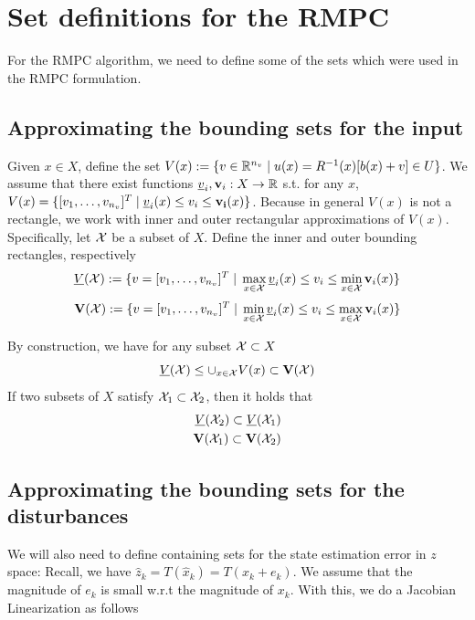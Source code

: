\section{Set definitions for the RMPC}

For the RMPC algorithm, we need to define some of the sets which were used in the RMPC formulation.

\subsection{Approximating the bounding sets for the input}
\label{sec:approx input sets}
Given $x \in X$, define the set $V(x) := \{v \in \mathbb{R}^{n_v} \;|\; u(x) = R^{-1}(x)[b(x)+v] \in U\}$.
We assume that there exist functions $\underline{v}_i, \mathbf{v}_i: X \rightarrow \mathbb{R}$ s.t. for any $x$, $V(x) = \{[v_1,\ldots,v_{n_v}]^T \;|\; \underline{v}_i(x) \leq v_i \leq \mathbf{v_i}(x) \}$.
Because in general $V(x)$ is not a rectangle, we work with inner and outer rectangular approximations of $V(x)$.
Specifically, let $\mathcal{X}$ be a subset of $X$.
Define the inner and outer bounding rectangles, respectively
\[\underline{V}(\mathcal{X}) := \{v=[v_1,\ldots,v_{n_v}]^T \;|\; \max_{x\in \mathcal{X}} \underline{v}_i(x)  \leq v_i \leq \min_{x \in \mathcal{X}} \mathbf{v}_i(x) \} \]
\[\mathbf{V}(\mathcal{X}) := \{v=[v_1,\ldots,v_{n_v}]^T \;|\; \min_{x\in \mathcal{X}} \underline{v}_i(x)  \leq v_i \leq \max_{x \in \mathcal{X}} \mathbf{v}_i(x) \} \]

By construction, we have for any subset $\mathcal{X} \subset X$
\begin{equation}
\label{eq:Vbounds}
\underline{V}(\mathcal{X}) \leq \cup_{x \in \mathcal{X}} V(x) \subset \mathbf{V}(\mathcal{X})
\end{equation}
If two subsets of $X$ satisfy $\mathcal{X}_1 \subset \mathcal{X}_2$, then it holds that 
\begin{eqnarray}
\label{eq:V inclusions}
\underline{V}(\mathcal{X}_2) \subset \underline{V}(\mathcal{X}_1)
\nonumber
\\
\mathbf{V}(\mathcal{X}_1) \subset \mathbf{V}(\mathcal{X}_2)
\end{eqnarray}


\subsection{Approximating the bounding sets for the disturbances}
\label{sec:approx dist}
We will also need to define containing sets for the state estimation error in $z$ space:
Recall, we have $\hat{z}_k = T(\hat{x}_k) = T(x_k+e_k)$. We assume that the magnitude of $e_k$ is small w.r.t the magnitude of $x_k$. With this, we do a Jacobian Linearization as follows

